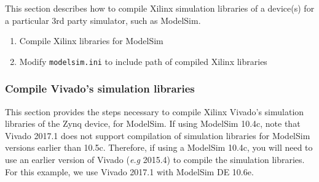 \begin{flushleft}
	This section describes how to compile Xilinx simulation libraries of a device(s) for a particular 3rd party simulator, such as ModelSim.

	\begin{enumerate}
	 	\item Compile Xilinx libraries for ModelSim
		\item Modify \texttt{modelsim.ini} to include path of compiled Xilinx libraries
	\end{enumerate}

\subsubsection{Compile Vivado's simulation libraries}
	This section provides the steps necessary to compile Xilinx Vivado's simulation libraries of the Zynq device, for ModelSim. If using ModelSim 10.4c, note that Vivado 2017.1 does not support compilation of simulation libraries for ModelSim versions earlier than 10.5c. Therefore, if using a ModelSim 10.4c, you will need to use an earlier version of Vivado (\textit{e.g} 2015.4) to compile the simulation libraries. For this example, we use Vivado 2017.1 with ModelSim DE 10.6e.


\end{flushleft}
